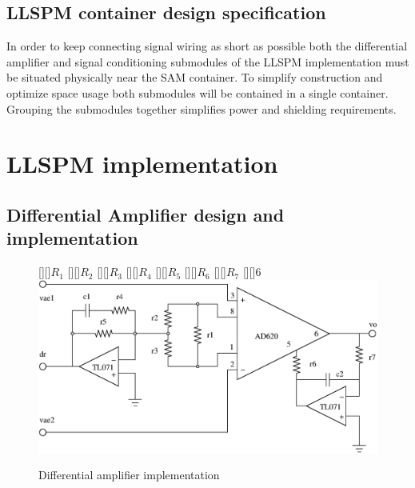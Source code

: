 \subsection{LLSPM container design specification}
In order to keep connecting signal wiring as short as possible both
the differential amplifier and signal conditioning submodules of the
LLSPM implementation must be situated physically near the SAM
container. To simplify construction and optimize space usage both
submodules will be contained in a single container. Grouping the
submodules together simplifies power and shielding requirements.


\section{LLSPM implementation}
\subsection{Differential Amplifier design and implementation}
\begin{figure}[htbp]
	\begin{center}
	[][]{$R_1$} 
	[][]{$R_2$} 
	[][]{$R_3$} 
	[][]{$R_4$} 
	[][]{$R_5$} 
	[][]{$R_6$} 
	[][]{$R_7$} 
	\psfrag{+}{+}
	\psfrag{-}{--}
	[][]{6}
	\includegraphics[width=\textwidth]{instrumentation-amp.eps}
	\caption{Differential amplifier implementation}
	\label{fig:instrumentation-amp} 
	\end{center}
\end{figure}

